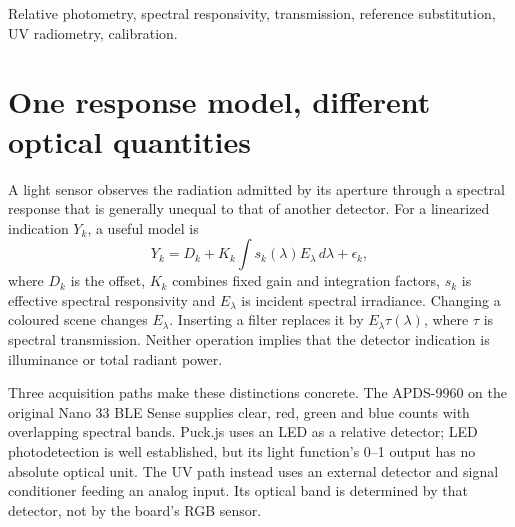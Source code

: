 \begin{abstract}
Relative optical measurements depend on a reference, a collection geometry and the spectral response of the detector. We develop one reduction framework for RGBC counts, an LED-based relative sensor and an external analog UV detector. Example colour records distinguish selective response from saturation: all four RGBC channels clip at 4100 counts, while unsaturated filter extrema retain 0.872, 0.781 and 0.847 in their favoured channels after local referencing. A bracketed LED measurement gives a relative sample response of 0.553. The UV observations distinguish transmissions of 0.500, 0.400 and 0.283, with single-reading precision near 0.003 estimated from plateau scatter; their absolute irradiances use separate electrical and radiometric calibration factors. These comparisons identify what reference substitution cancels, which spectral and geometrical dependencies remain, and why small numerical scatter alone cannot establish an optical scale.
\end{abstract}
\begin{IEEEkeywords}
Relative photometry, spectral responsivity, transmission, reference substitution, UV radiometry, calibration.
\end{IEEEkeywords}

\section{One response model, different optical quantities}
A light sensor observes the radiation admitted by its aperture through a spectral response that is generally unequal to that of another detector. For a linearized indication $Y_k$, a useful model is
\begin{equation}
 Y_k=D_k+K_k\int s_k(\lambda)E_\lambda\,d\lambda+\epsilon_k,
 \label{eq:light-rgb-response}
\end{equation}
where $D_k$ is the offset, $K_k$ combines fixed gain and integration factors, $s_k$ is effective spectral responsivity and $E_\lambda$ is incident spectral irradiance. Changing a coloured scene changes $E_\lambda$. Inserting a filter replaces it by $E_\lambda\tau(\lambda)$, where $\tau$ is spectral transmission. Neither operation implies that the detector indication is illuminance or total radiant power.

Three acquisition paths make these distinctions concrete. The APDS-9960 on the original Nano 33 BLE Sense supplies clear, red, green and blue counts with overlapping spectral bands\cite{apds9960}. Puck.js uses an LED as a relative detector; LED photodetection is well established\cite{mims1992}, but its light function's 0--1 output has no absolute optical unit\cite{pucklight2026}. The UV path instead uses an external detector and signal conditioner feeding an analog input. Its optical band is determined by that detector, not by the board's RGB sensor.

